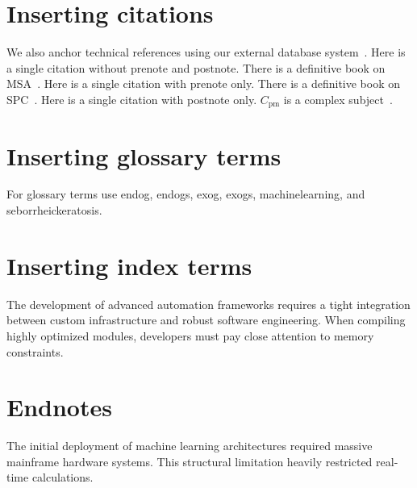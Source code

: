 \section{Inserting citations}\label{sec:citations}
We also anchor technical references using our external database system~\cite{wheeler1989}. Here is a single citation without prenote and postnote. There is a definitive book on MSA~\cite{wheeler2006}. Here is a single citation with prenote only. There is a definitive book on SPC~\cite{wheeler2006}. Here is a single citation with postnote only. $C_\text{pm}$ is a complex subject~\cite[][1-10]{chan1988}.

\section{Inserting glossary terms}\label{sec:glossary_terms}

For glossary terms use \gls{endog}, \glspl{endog}, \gls{exog}, \glspl{exog}, \gls{machinelearning}, and \gls{seborrheickeratosis}.

\section{Inserting index terms}\label{sec:index_terms}

The development of advanced automation frameworks requires a tight integration between custom infrastructure and robust software engineering. When compiling highly optimized modules, developers must pay close attention to memory constraints.

\section{Endnotes}
The initial deployment of machine learning architectures required massive mainframe hardware systems. This structural limitation heavily restricted real-time calculations.
